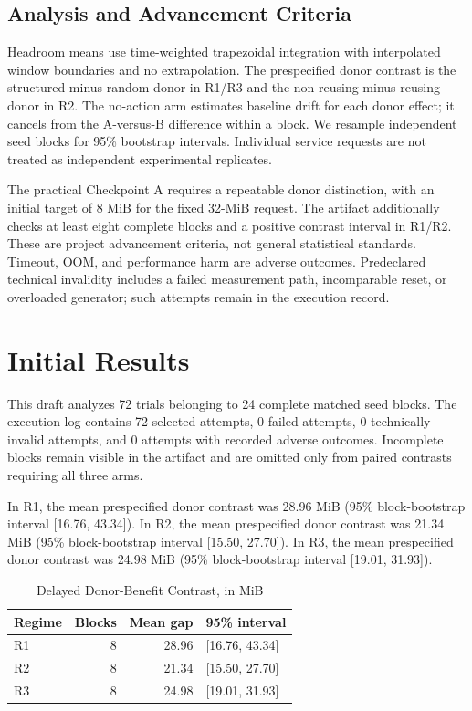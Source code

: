 \documentclass[conference]{IEEEtran}
\begin{document}
\subsection{Analysis and Advancement Criteria}
Headroom means use time-weighted trapezoidal integration with interpolated
window boundaries and no extrapolation. The prespecified donor contrast is the
structured minus random donor in R1/R3 and the non-reusing minus reusing donor
in R2. The no-action arm estimates baseline drift for each donor effect; it
cancels from the A-versus-B difference within a block. We resample independent
seed blocks for 95\% bootstrap intervals. Individual service requests are not
treated as independent experimental replicates.

The practical Checkpoint A requires a repeatable donor distinction, with an
initial target of 8 MiB for the fixed 32-MiB request. The artifact additionally
checks at least eight complete blocks and a positive contrast interval in R1/R2.
These are project advancement criteria, not general statistical standards.
Timeout, OOM, and performance harm are adverse outcomes. Predeclared technical
invalidity includes a failed measurement path, incomparable reset, or overloaded
generator; such attempts remain in the execution record.

\section{Initial Results}
This draft analyzes 72 trials belonging to 24 complete matched seed blocks. The execution log contains 72 selected attempts, 0 failed attempts, 0 technically invalid attempts, and 0 attempts with recorded adverse outcomes. Incomplete blocks remain visible in the artifact and are omitted only from paired contrasts requiring all three arms.

In R1, the mean prespecified donor contrast was 28.96 MiB (95\% block-bootstrap interval [16.76, 43.34]). In R2, the mean prespecified donor contrast was 21.34 MiB (95\% block-bootstrap interval [15.50, 27.70]). In R3, the mean prespecified donor contrast was 24.98 MiB (95\% block-bootstrap interval [19.01, 31.93]).

\begin{table}[t]
\caption{Delayed Donor-Benefit Contrast, in MiB}
\label{tab:results}
\centering\small
\begin{tabular}{@{}lrrl@{}}
\toprule
Regime & Blocks & Mean gap & 95\% interval \\
\midrule
R1 & 8 & 28.96 & [16.76, 43.34] \\
R2 & 8 & 21.34 & [15.50, 27.70] \\
R3 & 8 & 24.98 & [19.01, 31.93] \\
\bottomrule
\end{tabular}
\end{table}
\end{document}
